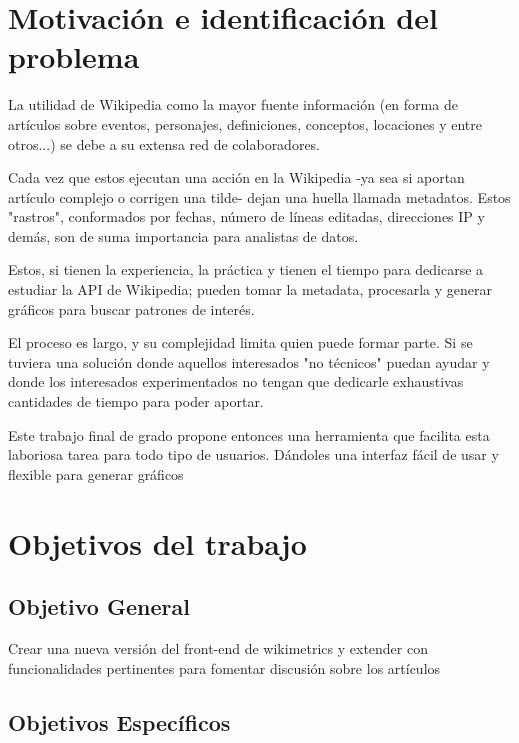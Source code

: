

\section{Motivación e identificación del problema}

La utilidad de Wikipedia como la mayor fuente información (en forma de artículos sobre eventos, personajes, definiciones, conceptos, locaciones y entre otros...) se debe a su extensa red de colaboradores.

Cada vez que estos ejecutan una acción en la Wikipedia -ya sea si aportan artículo complejo o corrigen una tilde- dejan una huella llamada metadatos. Estos "rastros", conformados por fechas, número de líneas editadas, direcciones IP y demás, son de suma importancia para analistas de datos.

Estos, si tienen la experiencia, la práctica y tienen el tiempo para dedicarse a estudiar la API de Wikipedia; pueden tomar la metadata, procesarla y generar gráficos para buscar patrones de interés. 

El proceso es largo, y su complejidad limita quien puede formar parte. Si se tuviera una solución donde aquellos interesados "no técnicos" puedan ayudar y donde los interesados experimentados no tengan que dedicarle exhaustivas cantidades de tiempo para poder aportar.

Este trabajo final de grado propone entonces una herramienta que facilita esta laboriosa tarea para todo tipo de usuarios. 
Dándoles una interfaz fácil de usar y flexible para generar gráficos 


\section{Objetivos del trabajo}




\subsection{Objetivo General}
Crear una nueva versión del front-end de wikimetrics y extender con funcionalidades pertinentes para fomentar discusión sobre los artículos

\subsection{Objetivos Específicos}

